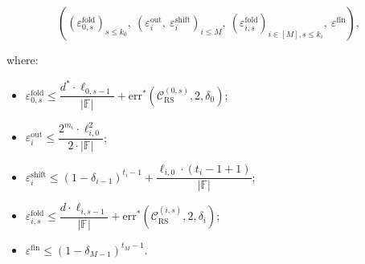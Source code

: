 \begin{theorem}
    \[
((\varepsilon_{0,s}^{\mathrm{fold}})_{s \leq k_0},\ (\varepsilon_i^{\mathrm{out}},\ \varepsilon_i^{\mathrm{shift}})_{i \leq M},\ (\varepsilon_{i,s}^{\mathrm{fold}})_{i \in [M], s \leq k_i},\ \varepsilon^{\mathrm{fin}}),
\]

{where:}

\begin{itemize}
    \item $\varepsilon_{0,s}^{\mathrm{fold}} \leq \dfrac{d^* \cdot \ell_{0,s-1}}{|\mathbb{F}|} + \mathrm{err}^*(\mathcal{C}_{\mathrm{RS}}^{(0,s)}, 2, \delta_0)$;
    \item $\varepsilon_i^{\mathrm{out}} \leq \dfrac{2^{m_i} \cdot \ell_{i,0}^2}{2 \cdot |\mathbb{F}|}$;
    \item $\varepsilon_i^{\mathrm{shift}} \leq (1 - \delta_{i-1})^{t_i - 1} + \dfrac{\ell_{i,0} \cdot (t_i - 1 + 1)}{|\mathbb{F}|}$;
    \item $\varepsilon_{i,s}^{\mathrm{fold}} \leq \dfrac{d \cdot \ell_{i,s-1}}{|\mathbb{F}|} + \mathrm{err}^*(\mathcal{C}_{\mathrm{RS}}^{(i,s)}, 2, \delta_i)$;
    \item $\varepsilon^{\mathrm{fin}} \leq (1 - \delta_{M-1})^{t_M - 1}$.
\end{itemize}
\end{theorem}


